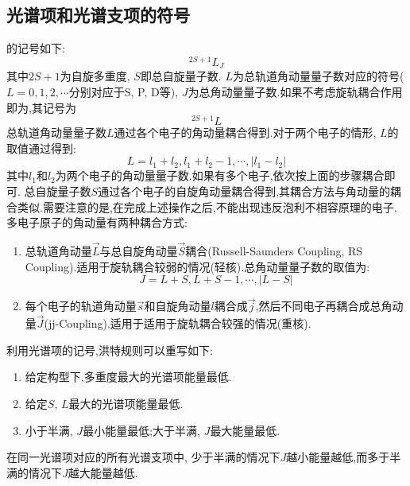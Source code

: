 \documentclass{ctexbook}
\begin{document}
\subsection{光谱项和光谱支项的符号}
的记号如下:
\[^{2S+1}L_J\]
其中$2S+1$为自旋多重度, $S$即总自旋量子数. $L$为总轨道角动量量子数对应的符号($L=0,1,2,\cdots$分别对应于S, P, D等), $J$为总角动量量子数.如果不考虑旋轨耦合作用即为,其记号为
\[^{2S+1}L\]
\indent 总轨道角动量量子数$L$通过各个电子的角动量耦合得到.对于两个电子的情形, $L$的取值通过得到:
\[L=l_1+l_2,l_1+l_2-1,\cdots,\left|l_1-l_2\right|\]
其中$l_1$和$l_2$为两个电子的角动量量子数.如果有多个电子,依次按上面的步骤耦合即可.
\indent 总自旋量子数$S$通过各个电子的自旋角动量耦合得到,其耦合方法与角动量的耦合类似.需要注意的是,在完成上述操作之后,不能出现违反泡利不相容原理的电子.\\
\indent 多电子原子的角动量有两种耦合方式:
\begin{enumerate}[label=\tbf{(\alph*)}]
	\item 总轨道角动量$\vec{L}$与总自旋角动量$\vec{S}$耦合(Russell-Saunders Coupling, RS Coupling).适用于旋轨耦合较弱的情况(轻核).总角动量量子数的取值为:
	\[J=L+S,L+S-1,\cdots,|L-S|\]
	\item 每个电子的轨道角动量$\vec{s}$和自旋角动量$l$耦合成$\vec{j}$,然后不同电子再耦合成总角动量$\vec{J}$(jj-Coupling).适用于适用于旋轨耦合较强的情况(重核).
\end{enumerate}
利用光谱项的记号,洪特规则可以重写如下:
\begin{theorem}[洪特规则]
	\begin{enumerate}[label=\tbf{\alph*.}]
		\item 给定构型下,多重度最大的光谱项能量最低.
		\item 给定$S$, $L$最大的光谱项能量最低.
		\item 小于半满, $J$最小能量最低;大于半满, $J$最大能量最低.
	\end{enumerate}
\end{theorem}
在同一光谱项对应的所有光谱支项中, 少于半满的情况下$J$越小能量越低,而多于半满的情况下$J$越大能量越低.
\end{document}
